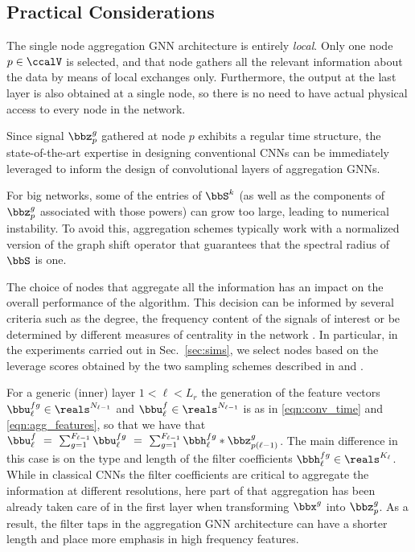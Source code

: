 %
\subsection{Practical Considerations}

 The single node aggregation GNN architecture is entirely \emph{local}. Only one node $p \in \ccalV$ is selected, and that node gathers all the relevant information about the data by means of local exchanges only. Furthermore, the output at the last layer is also obtained at a single node, so there is no need to have actual physical access to every node in the network.

 Since signal $\bbz_{p}^{g}$ gathered at node $p$ exhibits a regular time structure, the state-of-the-art expertise in designing conventional CNNs can be immediately leveraged to inform the design of convolutional layers of aggregation GNNs.

 For big networks, some of the entries of $\bbS^{k}$ (as well as the components of $\bbz_p^{g}$ associated with those powers) can grow too large, leading to numerical instability. To avoid this, aggregation schemes typically work with a normalized version of the graph shift operator that guarantees that the spectral radius of $\bbS$ is one. 
  
 The choice of nodes that aggregate all the information has an impact on the overall performance of the algorithm. This decision can be informed by several criteria such as the degree, the frequency content of the signals of interest \cite{marques16-aggregation} or be determined by different measures of centrality in the network \cite{segarra16-centrality}. In particular, in the experiments carried out in Sec.~\ref{sec:sims}, we select nodes based on the leverage scores obtained by the two sampling schemes described in \cite{anis16-spectralproxies} and \cite{varma15-scores}.

 For a generic (inner) layer $1<\ell<L_{r}$ the generation of the feature vectors $\bbu_{\ell}^{fg}\in \reals^{N_{\ell-1}}$ and $\bbu_{\ell}^{f}\in \reals^{N_{\ell-1}}$ is as in \eqref{eqn:conv_time} and \eqref{eqn:agg_features}, so that we have that $\bbu_{\ell}^{f}\ =\ \sum_{g=1}^{F_{\ell-1}} \bbu_{\ell}^{fg}\  =\ \sum_{g=1}^{F_{\ell-1}} \bbh_{\ell}^{fg} \ast \bbz_{p(\ell-1)}^{g}$. The main difference in this case is on the type and length of the filter coefficients $\bbh_{\ell}^{fg}\in \reals^{K_{\ell}}$. While in classical CNNs the filter coefficients are critical to aggregate the information at different resolutions, here part of that aggregation has been already taken care of in the first layer when transforming $\bbx^{g}$ into $\bbz_p^{g}$. As a result, the filter taps in the aggregation GNN architecture can have a shorter length and place more emphasis in high frequency features.

